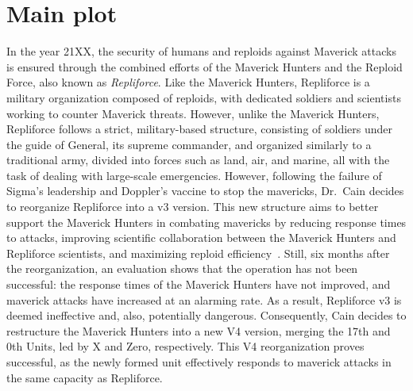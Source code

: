 \section{Main plot}

In the year 21XX, the security of humans and reploids against Maverick attacks is ensured through the combined efforts of the Maverick Hunters and the Reploid Force, also known as \textit{Repliforce}. Like the Maverick Hunters, Repliforce is a military organization composed of reploids, with dedicated soldiers and scientists working to counter Maverick threats. However, unlike the Maverick Hunters, Repliforce follows a strict, military-based structure, consisting of soldiers under the guide of General, its supreme commander, and organized similarly to a traditional army, divided into forces such as land, air, and marine, all with the task of dealing with large-scale emergencies. However, following the failure of Sigma's leadership and Doppler's vaccine to stop the mavericks, Dr.~Cain decides to reorganize Repliforce into a v3 version. This new structure aims to better support the Maverick Hunters in combating mavericks by reducing response times to attacks, improving scientific collaboration between the Maverick Hunters and Repliforce scientists, and maximizing reploid efficiency~\cite{X4:Manual}. Still, six months after the reorganization, an evaluation shows that the operation has not been successful: the response times of the Maverick Hunters have not improved, and maverick attacks have increased at an alarming rate. As a result, Repliforce v3 is deemed ineffective and, also, potentially dangerous. Consequently, Cain decides to restructure the Maverick Hunters into a new V4 version, merging the 17th and 0th Units, led by X and Zero, respectively. This V4 reorganization proves successful, as the newly formed unit effectively responds to maverick attacks in the same capacity as Repliforce.

